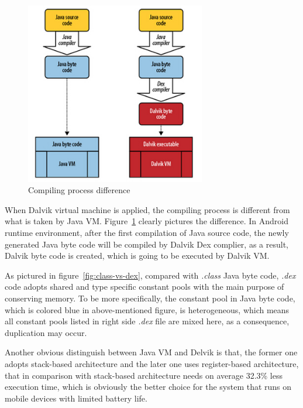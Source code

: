  \begin{figure}[!htbp]
	\centering
	\includegraphics[width=0.7\textwidth]{vm-compare.jpg}
		\caption{Compiling process difference\cite{learn_android}}
	\label{fig:vm-compare}
\end{figure}
When Dalvik virtual machine is applied, the compiling process is different from what is taken by Java VM. Figure~\ref{fig:vm-compare} clearly pictures the difference. In Android runtime environment, after the first compilation of Java source code, the newly generated Java byte code will be compiled by Dalvik Dex complier, as a result, Dalvik byte code is created, which is going to be executed by Dalvik VM.

As pictured in figure~\ref{fig:class-vs-dex}, compared with \emph{.class} Java byte code, \emph{.dex} code adopts shared and type specific constant pools with the main purpose of conserving memory\cite{android_vm}. To be more specifically,  the constant pool in Java byte code, which is colored blue in above-mentioned figure, is heterogeneous, which means all constant pools listed in right side \emph{.dex} file are mixed here, as a consequence, duplication may occur.    

Another obvious distinguish between Java VM and Delvik is that, the former one adopts stack-based architecture and  the later one uses register-based architecture, that in comparison with stack-based architecture needs on average 32.3\% less execution time\cite{android_vm}, which is obviously the better choice for the system that runs on mobile devices with limited battery life.

